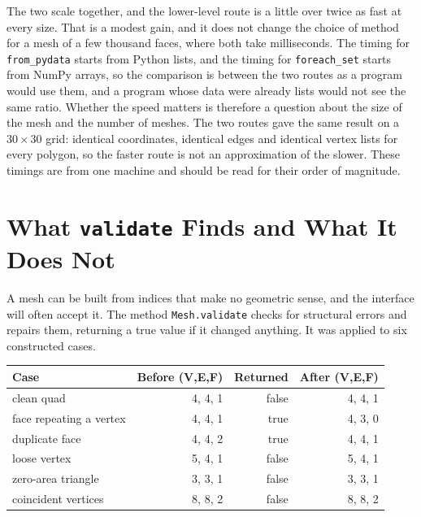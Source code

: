 The two scale together, and the lower-level route is a little over twice as fast at every size. That is a modest gain, and it does not change the choice of method for a mesh of a few thousand faces, where both take milliseconds. The timing for \texttt{from\_pydata} starts from Python lists, and the timing for \texttt{foreach\_set} starts from NumPy arrays, so the comparison is between the two routes as a program would use them, and a program whose data were already lists would not see the same ratio. Whether the speed matters is therefore a question about the size of the mesh and the number of meshes. The two routes gave the same result on a $30\times30$ grid: identical coordinates, identical edges and identical vertex lists for every polygon, so the faster route is not an approximation of the slower. These timings are from one machine and should be read for their order of magnitude.

\section{What \texttt{validate} Finds and What It Does Not}

A mesh can be built from indices that make no geometric sense, and the interface will often accept it. The method \texttt{Mesh.validate} checks for structural errors and repairs them, returning a true value if it changed anything. It was applied to six constructed cases.

\begin{center}
\begin{tabular}{lrrr}
\toprule
Case & Before (V,E,F) & Returned & After (V,E,F)\\
\midrule
clean quad & 4, 4, 1 & false & 4, 4, 1\\
face repeating a vertex & 4, 4, 1 & true & 4, 3, 0\\
duplicate face & 4, 4, 2 & true & 4, 4, 1\\
loose vertex & 5, 4, 1 & false & 5, 4, 1\\
zero-area triangle & 3, 3, 1 & false & 3, 3, 1\\
coincident vertices & 8, 8, 2 & false & 8, 8, 2\\
\bottomrule
\end{tabular}
\end{center}

